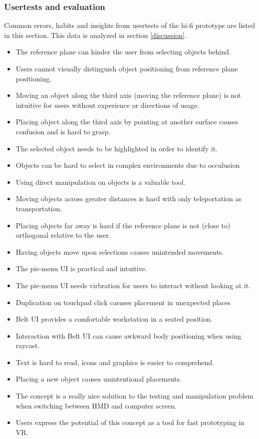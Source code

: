 \subsubsection{Usertests and evaluation}
Common errors, habits and insights from usertests of the hi-fi prototyps are listed in this section. This data is analyzed in section \ref{discussion}.

\begin{itemize}

  \item The reference plane can hinder the user from selecting objects behind.
  \item Users cannot visually distinguish object positioning from reference plane positioning.
  \item Moving an object along the third axis (moving the reference plane) is not intuitive for users without experience or directions of usage.
  \item Placing object along the third axis by pointing at another surface causes confusion and is hard to grasp.

  \item The selected object needs to be highlighted in order to identify it.
  \item Objects can be hard to select in complex environments due to occulusion
  \item Using direct manipulation on objects is a valuable tool.
  \item Moving objects across greater distances is hard with only teleportation as transportation.
  \item Placing objects far away is hard if the reference plane is not (close to) orthogonal relative to the user.
  \item Having objects move upon selections causes unintended movements.

  \item The pie-menu UI is practical and intuitive.
  \item The pie-menu UI needs virbration for users to interact without looking at it.
  \item Duplication on touchpad click casuses placement in unexpected places

  \item Belt UI provides a comfortable workstation in a seated position.
  \item Interaction with Belt UI can cause awkward body positioning when using raycast.
  \item Text is hard to read, icons and graphics is easier to comprehend.
  \item Placing a new object causes unintentional placements.

  \item The concept is a really nice solution to the testing and manipulation problem when switching between HMD and computer screen.
  \item Users express the potential of this concept as a tool for fast prototyping in VR.

\end{itemize}
